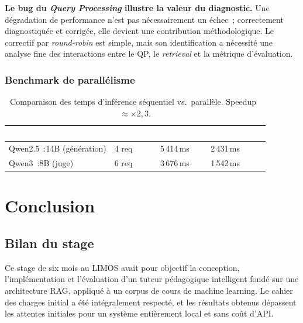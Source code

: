 \documentclass[11pt,a4paper]{article}
\begin{document}
\textbf{Le bug du \textit{Query Processing} illustre la valeur du diagnostic.} Une dégradation de performance n'est pas nécessairement un échec~; correctement diagnostiquée et corrigée, elle devient une contribution méthodologique. Le correctif par \textit{round-robin} est simple, mais son identification a nécessité une analyse fine des interactions entre le QP, le \textit{retrieval} et la métrique d'évaluation.


\subsubsection*{Benchmark de parallélisme}

\begin{table}[H]
\centering
\begin{tabularx}{0.8\linewidth}{L{3.5cm} C{2.5cm} C{2.5cm} C{2.5cm}}
\toprule
{}
\textcolor{white}{\textbf{Modèle}} &
\textcolor{white}{\textbf{Requêtes}} &
\textcolor{white}{\textbf{Séquentiel}} &
\textcolor{white}{\textbf{Parallèle (4)}} \\
\midrule
Qwen2.5~:14B (génération) & 4 req  & 5\,414\,ms & 2\,431\,ms \\
Qwen3~:8B (juge)        & 6 req  & 3\,676\,ms & 1\,542\,ms \\
\bottomrule
\end{tabularx}
\caption{Comparaison des temps d'inférence séquentiel vs.\ parallèle. Speedup~$\approx \times 2,3$.}
\label{tab:benchmark}
\end{table}


\section{Conclusion}
\label{sec:conclusion}

\subsection{Bilan du stage}

Ce stage de six mois au LIMOS avait pour objectif la conception, l'implémentation et l'évaluation d'un tuteur pédagogique intelligent fondé sur une architecture RAG, appliqué à un corpus de cours de machine learning. Le cahier des charges initial a été intégralement respecté, et les résultats obtenus dépassent les attentes initiales pour un système entièrement local et sans coût d'API.
\end{document}
